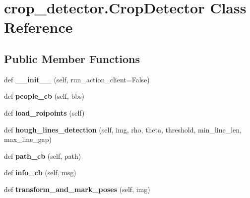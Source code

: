 \hypertarget{classcrop__detector_1_1CropDetector}{}\section{crop\+\_\+detector.\+Crop\+Detector Class Reference}
\label{classcrop__detector_1_1CropDetector}
\subsection*{Public Member Functions}
\begin{DoxyCompactItemize}
\item 
\mbox{\label{classcrop__detector_1_1CropDetector_a7dd6d3db0a4c057b605a1c910782547a}} 
def {\bfseries \+\_\+\+\_\+init\+\_\+\+\_\+} (self, run\+\_\+action\+\_\+client=False)
\item 
\mbox{\label{classcrop__detector_1_1CropDetector_a3deee491853ab9fb8dec07ac874982d9}} 
def {\bfseries people\+\_\+cb} (self, bbs)
\item 
\mbox{\label{classcrop__detector_1_1CropDetector_ad747ad7c614f2677277e282c94436bed}} 
def {\bfseries load\+\_\+roipoints} (self)
\item 
\mbox{\label{classcrop__detector_1_1CropDetector_a9e0db9f26e7a2490e98c6bb9e9a8ec80}} 
def {\bfseries hough\+\_\+lines\+\_\+detection} (self, img, rho, theta, threshold, min\+\_\+line\+\_\+len, max\+\_\+line\+\_\+gap)
\item 
\mbox{\label{classcrop__detector_1_1CropDetector_a71c7413743d6dff6297a038669542be7}} 
def {\bfseries path\+\_\+cb} (self, path)
\item 
\mbox{\label{classcrop__detector_1_1CropDetector_afd9cf2515a29b13b3d47469caaf18e9e}} 
def {\bfseries info\+\_\+cb} (self, msg)
\item 
\mbox{\label{classcrop__detector_1_1CropDetector_af96a13015a5862e32d5a456acb99b83b}} 
def {\bfseries transform\+\_\+and\+\_\+mark\+\_\+poses} (self, img)

\end{DoxyCompactItemize}
